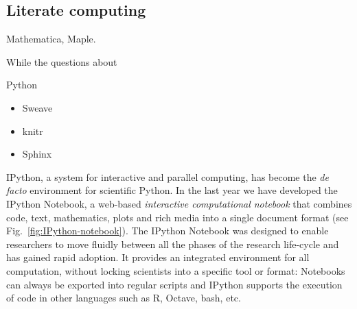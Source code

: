 \documentclass[ChapterTOCs,krantz2]{krantz} %
\begin{document}
\subsection{Literate computing}

Mathematica, Maple.


While the questions about

Python

\begin{itemize}
\item Sweave
\item knitr
\item Sphinx
\end{itemize}


IPython, a system for interactive and parallel computing, has become the \emph{
  de facto} environment for scientific Python. In the last year we have
developed the IPython Notebook, a web-based \emph{ interactive computational
  notebook} that combines code, text, mathematics, plots and rich media into a
single document format (see Fig.~\ref{fig:IPython-notebook}).  The IPython
Notebook was designed to enable researchers to move fluidly between all the
phases of the research life-cycle and has gained rapid adoption. It provides an
integrated environment for all computation, without locking scientists into a
specific tool or format: Notebooks can always be exported into regular scripts
and IPython supports the execution of code in other languages such as R,
Octave, bash, etc.
\end{document}
